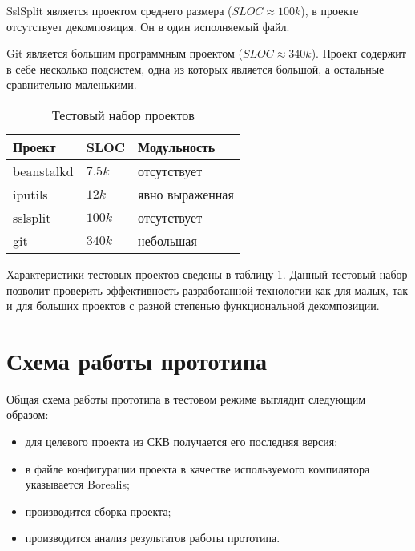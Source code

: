 SslSplit является проектом среднего размера ($SLOC \approx 100k$), в проекте отсутствует декомпозиция. Он в один исполняемый файл.

Git является большим программным проектом ($SLOC \approx 340k$). Проект содержит в себе несколько подсистем, одна из которых является большой, а остальные сравнительно маленькими.

\begin{table}
	\caption{Тестовый набор проектов}
	\begin{center}
	\begin{tabular}{|l|l|l|}
	\hline 
	\textbf{Проект} & \textbf{SLOC} & \textbf{Модульность}	\\ 
	\hline 
	beanstalkd & $7.5k$ & отсутствует \\ 
	\hline 
	iputils & $12k$ & явно выраженная \\ 
	\hline 
	sslsplit & $100k$  & отсутствует \\ 
	\hline 
	git & $340k$ & небольшая \\ 
	\hline 
	\end{tabular} 
	\end{center}
	\label{table:testProjects}
\end{table}

Характеристики тестовых проектов сведены в таблицу \ref{table:testProjects}. Данный тестовый набор позволит проверить эффективность разработанной технологии как для малых, так и для больших проектов с разной степенью функциональной декомпозиции.

\section{Схема работы прототипа}
Общая схема работы прототипа в тестовом режиме выглядит следующим образом:
\begin{itemize}
\item для целевого проекта из СКВ получается его последняя версия;
\item в файле конфигурации проекта в качестве используемого компилятора указывается Borealis;
\item производится сборка проекта;
\item производится анализ результатов работы прототипа.
\end{itemize}

